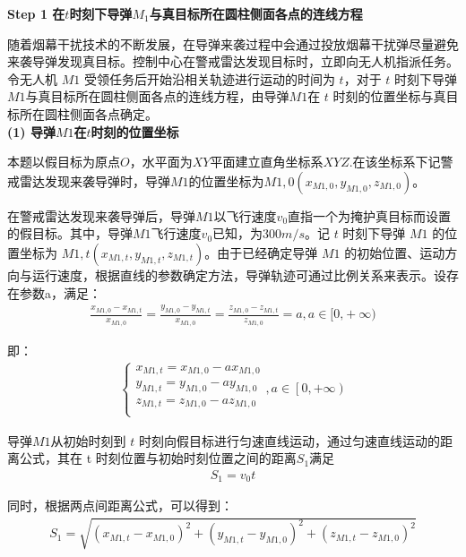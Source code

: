 \documentclass[../main.tex]{subfiles}
\begin{document}
\noindent \textbf{Step 1 在\( t \)时刻下导弹\( M_1 \)与真目标所在圆柱侧面各点的连线方程}
\par 随着烟幕干扰技术的不断发展，在导弹来袭过程中会通过投放烟幕干扰弹尽量避免来袭导弹发现真目标。控制中心在警戒雷达发现目标时，立即向无人机指派任务。令无人机 \( M1 \) 受领任务后开始沿相关轨迹进行运动的时间为 \( t \)，对于 \( t \) 时刻下导弹 \( M1 \)与真目标所在圆柱侧面各点的连线方程，由导弹$M1$在 \( t \) 时刻的位置坐标与真目标所在圆柱侧面各点确定。
\\
\textbf{(1) 导弹$M1$在\( t \)时刻的位置坐标}
\par 本题以假目标为原点$O$，水平面为$XY$平面建立直角坐标系$XYZ$.在该坐标系下记警戒雷达发现来袭导弹时，导弹$M1$的位置坐标为\( M{1,0}(x_{M{1,0}}, y_{M{1,0}}, z_{M{1,0}}) \)。
\par 在警戒雷达发现来袭导弹后，导弹\( M1 \)以飞行速度\( v_0 \)直指一个为掩护真目标而设置的假目标。其中，导弹$M1$飞行速度\( v_0 \)已知，为$300m/s$。记 \( t \) 时刻下导弹 \( M1 \) 的位置坐标为 \( M1,t(x_{M1,t}, y_{M1,t}, z_{M1,t}) \)。由于已经确定导弹 \( M1 \) 的初始位置、运动方向与运行速度，根据直线的参数确定方法，导弹轨迹可通过比例关系来表示。设存在参数a，满足：
\begin{align}\label{1.1}
\frac{x_{M1,0}-x_{M1,t}}{x_{M1,0}}=\frac{y_{M1,0}-y_{M1,t}}{x_{M1,0}}=\frac{z_{M1,0}-z_{M1,t}}{z_{M1,0}}=a,a\in \text{[0,}+\infty \text{)}
\end{align}
\par 即：
\begin{align}\label{1.2}
\left\{ \begin{array}{l}
	x_{M1,t}=x_{M1,0}-ax_{M1,0}\\
	y_{M1,t}=y_{M1,0}-ay_{M1,0}\\
	z_{M1,t}=z_{M1,0}-az_{M1,0}\\
\end{array} \right. ,a\in \left[ 0,+\infty \right)
\end{align}
\par 导弹$M1$从初始时刻到 \( t \) 时刻向假目标进行匀速直线运动，通过匀速直线运动的距离公式，其在 t 时刻位置与初始时刻位置之间的距离$S_1$满足
\begin{align}\label{1.5}
S_1 = v_0 t
\end{align}
\par 同时，根据两点间距离公式，可以得到：
\begin{align}\label{1.3}
S_1 =  \sqrt{(x_{M1,t} - x_{M1,0})^2 + (y_{M1,t} - y_{M1,0})^2 + (z_{M1,t} - z_{M1,0})^2}
\end{align}
\end{document}
